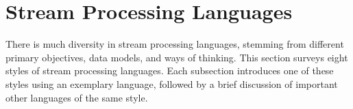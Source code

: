 \section{\hspace*{-2mm}Stream Processing Languages}\label{sec:languages}

There is much diversity in stream processing languages,
stemming from different primary objectives, data models, and ways of
thinking. This section surveys eight styles of stream processing languages.  Each
subsection introduces one of these styles using an exemplary language, followed by a
brief discussion of important other languages of the same style.











